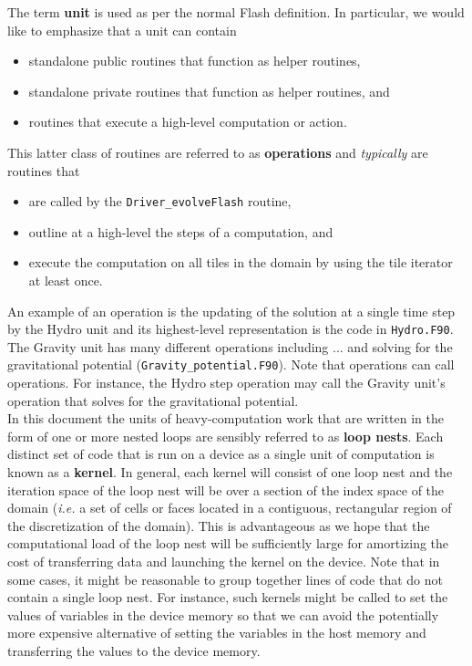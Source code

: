 \documentclass{article}
\begin{document}
The term \textbf{unit} is used as per the normal Flash definition.  In
particular, we would like to emphasize that a unit can contain
\begin{itemize}
\item{standalone public routines that function as helper routines,}
\item{standalone private routines that function as helper routines, and}
\item{routines that execute a high-level computation or action.}
\end{itemize}

This latter class of routines are referred to as \textbf{operations} and
\textit{typically} are routines that
\begin{itemize}
\item{are called by the \texttt{Driver\_evolveFlash} routine,}
\item{outline at a high-level the steps of a computation, and}
\item{execute the computation on all tiles in the domain by using the tile
iterator at least once.}
\end{itemize}
An example of an
operation is the updating of the solution at a single time step by the Hydro
unit and its highest-level representation is the code in \texttt{Hydro.F90}.
The Gravity unit has many different operations including ... and solving for the
gravitational potential (\texttt{Gravity\_potential.F90}).  Note that operations
can call operations.  For instance, the Hydro step operation may call the
Gravity unit's operation that solves for the gravitational potential.\\

In this document the units of heavy-computation work that are written in the
form of one or more nested loops are sensibly referred to as \textbf{loop
nests}.  Each distinct set of code that is run on a device as a single unit of
computation is known as a \textbf{kernel}.  In general, each kernel will consist
of one loop nest and the iteration space of the loop nest will be over a section
of the index space of the domain (\textit{i.e.} a set of cells or faces located
in a contiguous, rectangular region of the discretization of the domain).  This
is advantageous as we hope that the computational load of the loop nest will be
sufficiently large for amortizing the cost of transferring data and launching
the kernel on the device.  Note that in some cases, it might be reasonable to
group together lines of code that do not contain a single loop nest.  For
instance, such kernels might be called to set the values of variables in the
device memory so that we can avoid the potentially more expensive alternative of
setting the variables in the host memory and transferring the values to the device
memory.\\
\end{document}
